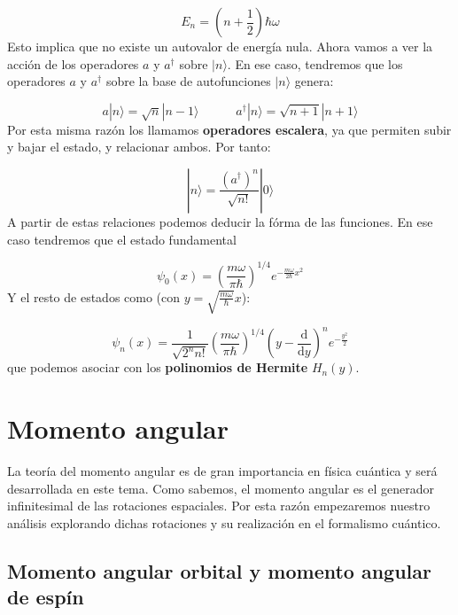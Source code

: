 \documentclass[12pt,a4paper]{book}
\numberwithin{equation}{chapter}
\numberwithin{figure}{chapter}
\newcommand{\tquad}{\quad \quad \quad}
\newcommand{\parentesis}[1]{\left( #1  \right)}
\newcommand{\D}{\mathrm{d}}
\newcommand{\derivadas}[2]{\frac{\D #1}{\D #2}}
\begin{document}
\begin{equation}
E_n=\parentesis{n+\frac{1}{2}} \hbar \omega
\end{equation}
Esto implica que no existe un autovalor de energía nula. Ahora vamos a ver la acción de los operadores $a$ y $a^\dagger$ sobre $|n\rangle$. En ese caso, tendremos que los operadores $a$ y $a^\dagger$ sobre la base de autofunciones $|n\rangle$ genera:

\begin{equation}
a | n \rangle = \sqrt{n} | n - 1 \rangle \tquad a^{\dagger} | n \rangle = \sqrt{n+1} |n+1\rangle
\end{equation}
Por esta misma razón los llamamos \textbf{operadores escalera}, ya que permiten subir y bajar el estado, y relacionar ambos. Por tanto:

\begin{equation}
| n  \rangle = \frac{(a^\dagger)^n}{\sqrt{n!}} | 0 \rangle 
\end{equation}
A partir de estas relaciones podemos deducir la fórma de las funciones. En ese caso tendremos que el estado fundamental

\begin{equation}
\psi_0 (x) = \parentesis{\frac{m \omega}{\pi \hbar}}^{1/4} e^{- \frac{m \omega}{2 \hbar} x^2}
\end{equation} 
Y el resto de estados como (con $y=\sqrt{\frac{m\omega}{\hbar}} x$):

\begin{equation}
\psi_n(x) = \frac{1}{\sqrt{2^n n!}} \parentesis{\frac{m \omega}{\pi \hbar}}^{1/4} \parentesis{y - \derivadas{}{y}}^n e^{- \frac{y^2}{2}}
\end{equation}
que podemos asociar con los \textbf{polinomios de Hermite} $H_n(y)$.

\chapter{Momento angular}

La teoría del momento angular es de gran importancia en física cuántica y será desarrollada en este tema. Como sabemos, el momento angular es el generador infinitesimal de las rotaciones espaciales. Por esta razón empezaremos nuestro análisis explorando dichas rotaciones y su realización en el formalismo cuántico. 

\section{Momento angular orbital y momento angular de espín}
\end{document}
